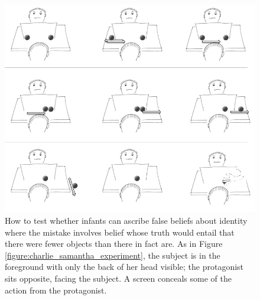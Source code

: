 \documentclass[12pt,\papersize]{extarticle}
\begin{document}
\begin{figure}
\begin{center}
\includegraphics[width=\textwidth]{figure_identity_balls_experiment.png}
\caption{
\label{figure:identity_balls_experiment}
	How to test whether infants can ascribe false beliefs about identity where the mistake involves belief whose truth would entail that there were fewer objects than there in fact are.  As in Figure \ref{figure:charlie_samantha_experiment}, the subject is in the foreground with only the back of  her head visible; the protagonist sits opposite, facing the subject.  A screen conceals some of the action from the protagonist.
}
\end{center}
\end{figure}
\end{document}
